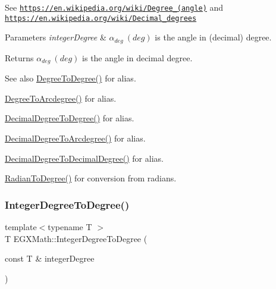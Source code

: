 See \href{https://en.wikipedia.org/wiki/Degree_(angle)}{\tt https\+://en.\+wikipedia.\+org/wiki/\+Degree\+\_\+(angle)} and \href{https://en.wikipedia.org/wiki/Decimal_degrees}{\tt https\+://en.\+wikipedia.\+org/wiki/\+Decimal\+\_\+degrees} 
\begin{DoxyParams}{Parameters}
{\em integer\+Degree} & $\alpha_{deg}\ (deg)$ is the angle in (decimal) degree. \\
\hline
\end{DoxyParams}
\begin{DoxyReturn}{Returns}
$\alpha_{deg}\ (deg)$ is the angle in decimal degree. 
\end{DoxyReturn}
\begin{DoxySeeAlso}{See also}
\mbox{\hyperlink{group___e_g_x_math-_angle_conversions-_degree_gaca157e7d3e99a46a11a04b92680d2574}{Degree\+To\+Degree()}} for alias. 

\mbox{\hyperlink{group___e_g_x_math-_angle_conversions-_degree_gac1b5f3b68f66c77a6df4ceef842c9b19}{Degree\+To\+Arcdegree()}} for alias. 

\mbox{\hyperlink{group___e_g_x_math-_angle_conversions-_decimal_degree_ga0aa7f2f5dbb00cf4ab303421c6e33ccf}{Decimal\+Degree\+To\+Degree()}} for alias. 

\mbox{\hyperlink{group___e_g_x_math-_angle_conversions-_decimal_degree_gacdd463fcabffeb598ebda65b012ce743}{Decimal\+Degree\+To\+Arcdegree()}} for alias. 

\mbox{\hyperlink{group___e_g_x_math-_angle_conversions-_decimal_degree_gafccf9cd779903872887978ab9d79661f}{Decimal\+Degree\+To\+Decimal\+Degree()}} for alias. 

\mbox{\hyperlink{group___e_g_x_math-_angle_conversions-_radian_ga25bbce6cdc1c3621f2a158d320e3bc45}{Radian\+To\+Degree()}} for conversion from radians. 
\end{DoxySeeAlso}
\mbox{\label{group___e_g_x_math-_angle_conversions-_integer_degree_gaa9b63c6095fd7f8809fcfa2ba1e62235}} 
\subsubsection{\texorpdfstring{Integer\+Degree\+To\+Degree()}{IntegerDegreeToDegree()}}
{\footnotesize\ttfamily template$<$typename T $>$ \\
T E\+G\+X\+Math\+::\+Integer\+Degree\+To\+Degree (\begin{DoxyParamCaption}\item[{const T \&}]{integer\+Degree }\end{DoxyParamCaption})}




